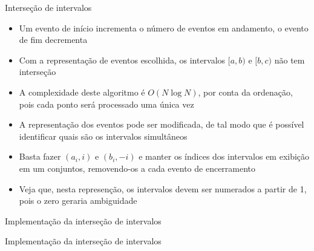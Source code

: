 \begin{frame}[fragile]{Interseção de intervalos}

    \begin{itemize}
        \item Um evento de início incrementa o número de eventos em andamento, o evento de fim
            decrementa
        \pause

        \item Com a representação de eventos escolhida, os intervalos $[a, b)$ e $[b, c)$ não tem
            interseção
        \pause

        \item A complexidade deste algoritmo é $O(N\log N)$, por conta da ordenação, pois
            cada ponto será processado uma única vez
        \pause

        \item A representação dos eventos pode ser modificada, de tal modo que é possível 
            identificar quais são os intervalos simultâneos
        \pause

        \item Basta fazer $(a_i, i)$ e $(b_i, -i)$ e manter os índices dos intervalos em
            exibição em um conjuntos, removendo-os a cada evento de encerramento
        \pause

        \item Veja que, nesta represenção, os intervalos devem ser numerados a partir de 1,
            pois o zero geraria ambiguidade
    \end{itemize}

\end{frame}



\begin{frame}[fragile]{Implementação da interseção de intervalos}
\end{frame}

\begin{frame}[fragile]{Implementação da interseção de intervalos}
\end{frame}
